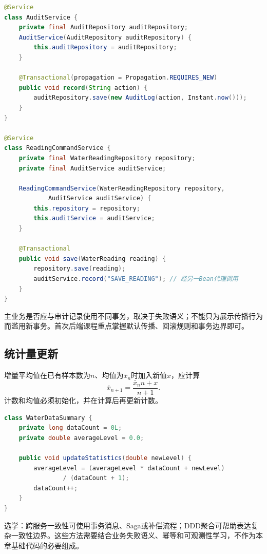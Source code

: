 \begin{lstlisting}[language=Java]
@Service
class AuditService {
    private final AuditRepository auditRepository;
    AuditService(AuditRepository auditRepository) {
        this.auditRepository = auditRepository;
    }

    @Transactional(propagation = Propagation.REQUIRES_NEW)
    public void record(String action) {
        auditRepository.save(new AuditLog(action, Instant.now()));
    }
}

@Service
class ReadingCommandService {
    private final WaterReadingRepository repository;
    private final AuditService auditService;

    ReadingCommandService(WaterReadingRepository repository,
            AuditService auditService) {
        this.repository = repository;
        this.auditService = auditService;
    }

    @Transactional
    public void save(WaterReading reading) {
        repository.save(reading);
        auditService.record("SAVE_READING"); // 经另一Bean代理调用
    }
}
\end{lstlisting}

主业务是否应与审计记录使用不同事务，取决于失败语义；不能只为展示传播行为而滥用新事务。首次后端课程重点掌握默认传播、回滚规则和事务边界即可。

\subsection{统计量更新}

增量平均值在已有样本数为$n$、均值为$\bar{x}_n$时加入新值$x$，应计算
\[
  \bar{x}_{n+1}=\frac{\bar{x}_n n+x}{n+1}.
\]
计数和均值必须初始化，并在计算后再更新计数。

\begin{lstlisting}[language=Java]
class WaterDataSummary {
    private long dataCount = 0L;
    private double averageLevel = 0.0;

    public void updateStatistics(double newLevel) {
        averageLevel = (averageLevel * dataCount + newLevel)
                / (dataCount + 1);
        dataCount++;
    }
}
\end{lstlisting}

\begin{tipbox}
选学：跨服务一致性可使用事务消息、Saga或补偿流程；DDD聚合可帮助表达复杂一致性边界。这些方法需要结合业务失败语义、幂等和可观测性学习，不作为本章基础代码的必要组成。
\end{tipbox}

